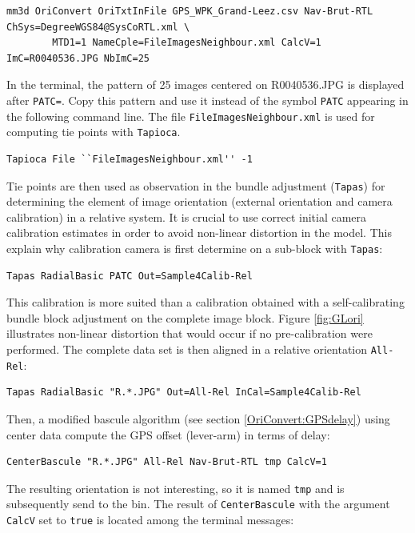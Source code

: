 \begin{verbatim}
mm3d OriConvert OriTxtInFile GPS_WPK_Grand-Leez.csv Nav-Brut-RTL ChSys=DegreeWGS84@SysCoRTL.xml \
        MTD1=1 NameCple=FileImagesNeighbour.xml CalcV=1 ImC=R0040536.JPG NbImC=25
\end{verbatim}

In the terminal, the pattern of 25 images centered on R0040536.JPG is displayed after {\tt PATC=}. Copy this pattern and use it instead of the symbol {\tt PATC} appearing in the following command line.
The file {\tt FileImagesNeighbour.xml} is used for computing tie points with {\tt Tapioca}.

\begin{verbatim}
Tapioca File ``FileImagesNeighbour.xml'' -1
\end{verbatim}

Tie points are then used as observation in the bundle adjustment ({\tt Tapas}) for determining the element of image orientation (external orientation and camera calibration) in a relative system. It is crucial to use correct initial camera calibration estimates in order to avoid non-linear distortion in the model. This explain why calibration camera is first determine on a sub-block with {\tt Tapas}:

\begin{verbatim}
Tapas RadialBasic PATC Out=Sample4Calib-Rel
\end{verbatim}

This calibration is more suited than a calibration obtained with a self-calibrating bundle block adjustment on the complete image block. Figure \ref{fig:GLori} illustrates non-linear distortion that would occur if no pre-calibration were performed. The complete data set is then aligned in a relative orientation {\tt All-Rel}:

\begin{verbatim}
Tapas RadialBasic "R.*.JPG" Out=All-Rel InCal=Sample4Calib-Rel
\end{verbatim}

Then, a modified bascule algorithm (see section \ref{OriConvert:GPSdelay}) using center data compute the GPS offset (lever-arm) in terms of delay:

\begin{verbatim}
CenterBascule "R.*.JPG" All-Rel Nav-Brut-RTL tmp CalcV=1
\end{verbatim}

The resulting orientation is not interesting, so it is named {\tt tmp} and is subsequently send to the bin. The result of {\tt CenterBascule} with the argument {\tt CalcV} set to {\tt true} is located among the terminal messages:

